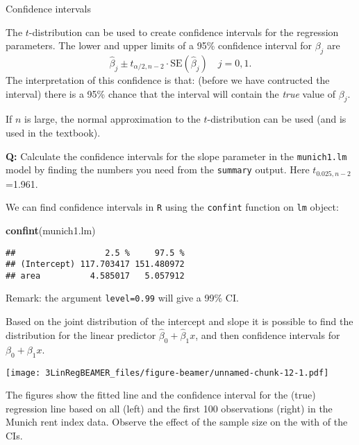 \documentclass[ignorenonframetext,]{beamer}
\newenvironment{Shaded}{\begin{snugshade}}{\end{snugshade}}
\newcommand{\KeywordTok}[1]{\textcolor[rgb]{0.13,0.29,0.53}{\textbf{#1}}}
\newcommand{\NormalTok}[1]{#1}
\begin{document}
\begin{frame}[fragile]

\begin{block}{Confidence intervals}

The \(t\)-distribution can be used to create confidence intervals for
the regression parameters. The lower and upper limits of a 95\%
confidence interval for \(\beta_j\) are
\[\hat{\beta}_j \pm t_{\alpha/2,n-2} \cdot\text{SE} (\hat{\beta}_j) \quad j=0, 1.\]
The interpretation of this confidence is that: (before we have
contructed the interval) there is a 95\% chance that the interval will
contain the \emph{true} value of \(\beta_j\).

If \(n\) is large, the normal approximation to the \(t\)-distribution
can be used (and is used in the textbook).

\textbf{Q:} Calculate the confidence intervals for the slope parameter
in the \texttt{munich1.lm} model by finding the numbers you need from
the \texttt{summary} output. Here \(t_{0.025,n-2}\)=1.961.

\end{block}

\end{frame}

\begin{frame}[fragile]

We can find confidence intervals in \texttt{R} using the
\texttt{confint} function on \texttt{lm} object:

\begin{Shaded}
\begin{Highlighting}[]
\KeywordTok{confint}\NormalTok{(munich1.lm)}
\end{Highlighting}
\end{Shaded}

\begin{verbatim}
##                  2.5 %     97.5 %
## (Intercept) 117.703417 151.480972
## area          4.585017   5.057912
\end{verbatim}

Remark: the argument \texttt{level=0.99} will give a 99\% CI.

Based on the joint distribution of the intercept and slope it is
possible to find the distribution for the linear predictor
\(\hat{\beta}_0+\hat{\beta}_1 x\), and then confidence intervals for
\(\beta_0+\beta_1 x\).

\end{frame}

\begin{frame}

\texttt{[image: 3LinRegBEAMER\_files/figure-beamer/unnamed-chunk-12-1.pdf]}

The figures show the fitted line and the confidence interval for the
(true) regression line based on all (left) and the first 100
observations (right) in the Munich rent index data. Observe the effect
of the sample size on the with of the CIs.

\end{frame}
\end{document}

